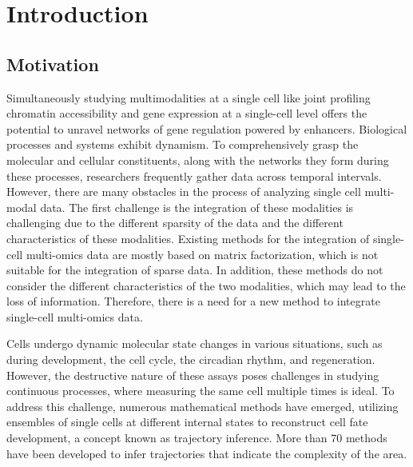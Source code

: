 \chapter{Introduction}
\label{chapter:introduction}

\graphicspath{{chapter1/figs/}}


\section{Motivation}
\label{introduction:sec1.motivation}

Simultaneously studying multimodalities at a single cell like joint profiling chromatin accessibility and gene expression at a single-cell level offers the potential to unravel networks of gene regulation powered by enhancers. Biological processes and systems exhibit dynamism. To comprehensively grasp the molecular and cellular constituents, along with the networks they form during these processes, researchers frequently gather data across temporal intervals. However, there are many obstacles in the process of analyzing single cell multi-modal data. The first challenge is the integration of these modalities is challenging due to the different sparsity of the data and the different characteristics of these modalities. Existing methods for the integration of single-cell multi-omics data are mostly based on matrix factorization, which is not suitable for the integration of sparse data. In addition, these methods do not consider the different characteristics of the two modalities, which may lead to the loss of information. Therefore, there is a need for a new method to integrate single-cell multi-omics data.

Cells undergo dynamic molecular state changes in various situations, such as during development, the cell cycle, the circadian rhythm, and regeneration. However, the destructive nature of these assays poses challenges in studying continuous processes, where measuring the same cell multiple times is ideal. To address this challenge, numerous mathematical methods have emerged, utilizing ensembles of single cells at different internal states to reconstruct cell fate development, a concept known as trajectory inference. More than 70 methods have been developed to infer trajectories that indicate the complexity of the area. 


